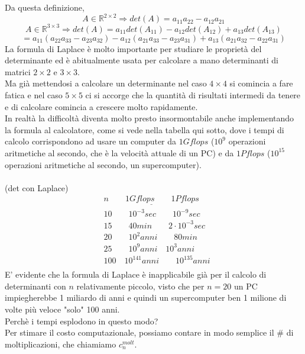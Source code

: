 \documentclass[12pt,a4paper]{article}
\begin{document}
Da questa definizione,
\begin{equation*}
    A\in\mathbb{R}^{2\times 2}\Rightarrow det(A)=a_{11}a_{22}-a_{12}a_{21}
\end{equation*}
\begin{equation*}
        A\in\mathbb{R}^{3\times 3}\Rightarrow det(A)=a_{11}det(A_{11})-a_{12}det(A_{12})+a_{13}det(A_{13})
\end{equation*}
\begin{equation*}
    = a_{11}(a_{22}a_{33}-a_{23}a_{32})-a_{12}(a_{21}a_{33}-a_{23}a_{31})+a_{13}(a_{21}a_{32}-a_{22}a_{31})
\end{equation*}
La formula di Laplace è molto importante per studiare le proprietà del determinante ed è abitualmente usata per calcolare a mano determinanti di matrici $2\times 2$ e $3\times 3$.\\
Ma già mettendosi a calcolare un determinante nel caso $4\times 4$ si comincia a fare fatica e nel caso $5\times5$ ci si accorge che la quantità di risultati intermedi da tenere e di calcolare comincia a crescere molto rapidamente.\\In realtà la difficoltà diventa molto presto insormontabile anche implementando la formula al calcolatore, come si vede nella tabella qui sotto, dove i tempi di calcolo corrispondono ad usare un computer da $1Gflops$ ($10^9$ operazioni aritmetiche al secondo, che è la velocità attuale di un PC) e da $1Pflops$ ($10^{15}$ operazioni aritmetiche al secondo, un supercomputer).\\\\
 (det con Laplace)
\[ \begin{split}
	& \underline{n\quad\quad 1Gflops\quad\quad 1Pflops}\\
	&  10\quad\quad 10^{-3}sec\quad\quad 10^{-9}sec\\
	&  15\quad\quad 40min\quad\quad 2\cdot10^{-3}sec\\
	& 20\quad\quad 10^{2}anni\quad\quad 80min\\
	& 25\quad\quad 10^{9}anni\quad 10^{3}anni\\
	& 100\quad 10^{141}anni\quad\quad 10^{135}anni\\ 
\end{split} \]
E' evidente che la formula di Laplace è inapplicabile già per il calcolo di determinanti con $n$ relativamente piccolo, visto che per $n=20$ un PC impiegherebbe 1 miliardo di anni e quindi un supercomputer ben 1 milione di volte più veloce "solo" 100 anni.\\Perchè i tempi esplodono in questo modo?\\Per stimare il costo computazionale, possiamo contare in modo semplice il \# di moltiplicazioni, che chiamiamo $c_n^{molt}$.\\
\end{document}
